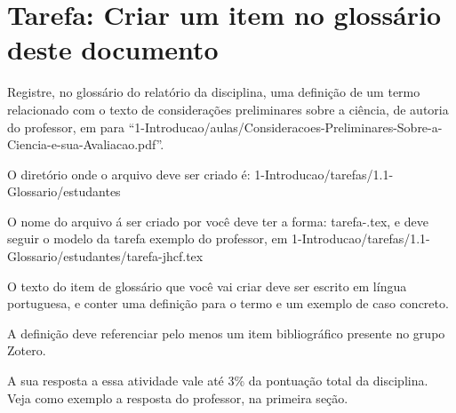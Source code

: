\section{Tarefa: Criar um item no glossário deste documento \label{tarefa:glossario}}

Registre, no glossário do relatório da disciplina, uma definição de um termo relacionado com o texto de considerações preliminares sobre a ciência, de autoria do professor, em para ``1-Introducao/aulas/Consideracoes-Preliminares-Sobre-a-Ciencia-e-sua-Avaliacao.pdf''.

O diretório onde o arquivo deve ser criado é: 
1-Introducao/tarefas/1.1-Glossario/estudantes

O nome do arquivo á ser criado por você deve ter a forma:
tarefa-\githubusername.tex, e deve seguir o modelo da tarefa exemplo do professor, em
1-Introducao/tarefas/1.1-Glossario/estudantes/tarefa-jhcf.tex

O texto do item de glossário que você vai criar deve ser escrito em língua portuguesa, e conter uma definição para o termo e um exemplo de caso concreto.

A definição deve referenciar pelo menos um item bibliográfico presente no grupo Zotero.

A sua resposta a essa atividade vale até 3\% da pontuação total da disciplina.
Veja como exemplo a resposta do professor, na primeira seção.


